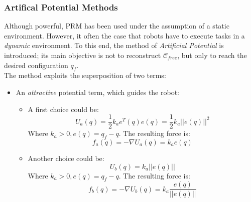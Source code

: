                         \subsubsection{Artifical Potential Methods}
                            Although powerful, PRM has been used under the assumption of a static environment. However, it often the case that robots have to execute tasks in a \textit{dynamic} environment. To this end, the method of \textit{Artificial Potential} is introduced; its main objective is not to reconstruct $\mathcal{C}_{free}$, but only to reach the desired configuration $q_f$.\\
                            The method exploits the superposition of two terms:
                            \begin{itemize}
                                \item An \textit{attractive} potential term, which guides the robot:
                                    \begin{itemize}
                                        \item A first choice could be:
                                            \begin{equation}\label{attractive_potentia_1}
                                                U_a(q)=\frac{1}{2}k_ae^{T}(q)e(q)=\frac{1}{2}k_a ||e(q)||^2
                                            \end{equation}
                                            Where $k_a>0, e(q)=q_f-q$. The resulting force is:
                                            \begin{equation*}
                                                f_a(q)=-\nabla U_a(q)=k_a e(q)
                                            \end{equation*}
                                        \item Another choice could be:
                                            \begin{equation}\label{attractive_potential_2}
                                                U_b(q)=k_a||e(q)||
                                            \end{equation}
                                            Where $k_a>0,e(q)=q_f-q$. The resulting force is:
                                            \begin{equation*}
                                                f_b(q)=-\nabla U_b(q)=k_a \frac{e(q)}{||e(q)||}
                                            \end{equation*}

\end{itemize}
\end{itemize}
